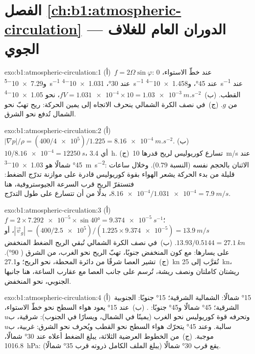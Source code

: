 \section*{الفصل \ref{ch:b1:atmospheric-circulation} --- الدوران العام للغلاف الجوي}

\begin{solution}{exo:b1:atmospheric-circulation:1}
(أ)~$f = 2\Omega\sin\varphi$: $0$ عند خطّ الاستواء، و\qty{7.29e-5}{s^{-1}} عند \ang{30}،
\qty{1.031e-4}{s^{-1}} عند \ang{45}، و\qty{1.458e-4}{s^{-1}} عند القطب. (ب)~$fV = \num{1.031e-4} \times 10 = \qty{1.03e-3}{m.s^{-2}}$، نحو \num{1.05e-4}
من $g$. (ج)~في نصف الكرة الشمالي ينحرف الاتجاه إلى يمين الحركة: ريح تهبّ نحو الشمال تُدفع نحو الشرق.
\end{solution}

\begin{solution}{exo:b1:atmospheric-circulation:2}
(أ)~$|\nabla p|/\rho = (400/\num{4e5})/1.225 = \qty{8.16e-4}{m.s^{-2}}$.
(ب)~$10/\num{8.16e-4} = \qty{12250}{s}$، أي \qty{3.4}{h}. (ج)~تسارع كوريوليس لريح قدرها \qty{10}{m/s} عند \ang{45} شمالًا هو \qty{1.03e-3}{m.s^{-2}}: الاثنان بالحجم نفسه (النسبة $0.79$). وخلال ساعات قليلة من بدء الحركة يشعر الهواء بقوة كوريوليس قادرة على موازنة تدرّج الضغط: فتستقرّ الريح قرب السرعة الجيوستروفية، هنا $\num{8.16e-4}/\num{1.031e-4} = \qty{7.9}{m/s}$، بدلًا من أن تتسارع على طول التدرّج.
\end{solution}

\begin{solution}{exo:b1:atmospheric-circulation:3}
(أ)~$f = 2 \times \num{7.292e-5} \times \sin\ang{40} = \qty{9.374e-5}{s^{-1}}$؛
$|\vec v_g| = (400/\num{2.5e5})/(1.225 \times \num{9.374e-5}) = \qty{13.9}{m/s}$، أو
$13.93/0.5144 = \qty{27.1}{kn}$. (ب)~في نصف الكرة الشمالي تُبقي الريح الضغط المنخفض على يسارها: مع كون المنخفض جنوبًا، تهبّ الريح نحو الغرب، من الشرق ( \ang{90}). (ج)~تشير العصا شرقًا من دائرة المحطة، نحو الريح؛ و\qty{27.1}{kn} تُقرَّب إلى \qty{25}{kn}، ريشتان كاملتان ونصف ريشة، تُرسم على جانب العصا مع عقارب الساعة، هنا جانبها الجنوبي، نحو المنخفض.
\end{solution}

\begin{solution}{exo:b1:atmospheric-circulation:4}
(أ)~\ang{15} شمالًا:  الشمالية الشرقية؛ \ang{15} جنوبًا:  الجنوبية الشرقية؛
\ang{45} شمالًا و\ang{45} جنوبًا: . (ب)~عند \ang{15} يعود هواء السطح  نحو خطّ الاستواء، وتحرفه قوة كوريوليس نحو الغرب (يمينًا في الشمال، ويسارًا في الجنوب): شرقية، ب$u$ سالبة. وعند \ang{45} يتحرّك هواء السطح  نحو القطب ويُحرف نحو الشرق: غربية، ب$u$ موجبة. (ج)~من الخطوط العرضية الثلاثة، يبلغ الضغط أعلاه عند \ang{30} شمالًا، \qty{1016.8}{hPa}: يقع  قرب \ang{30} شمالًا (يبلغ الملف الكامل ذروته قرب \ang{35} شمالًا).
\end{solution}

